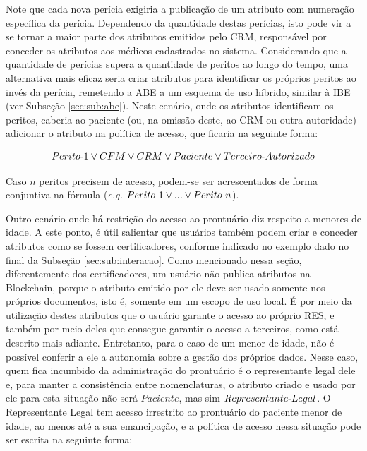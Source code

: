 \documentclass[a4paper,11pt]{article}
\begin{document}
Note que cada nova perícia exigiria a publicação de um atributo com numeração específica da perícia. Dependendo da quantidade destas perícias, isto pode vir a se tornar a maior parte dos atributos emitidos pelo CRM, responsável por conceder os atributos aos médicos cadastrados no sistema. Considerando que a quantidade de perícias supera a quantidade de peritos ao longo do tempo, uma alternativa mais eficaz seria criar atributos para identificar os próprios peritos ao invés da perícia, remetendo a ABE a um esquema de uso híbrido, similar à IBE (ver Subseção \ref{sec:sub:abe}).
Neste cenário, onde os atributos identificam os peritos, caberia ao paciente (ou, na omissão deste, ao CRM ou outra autoridade) adicionar o atributo na política de acesso, que ficaria na seguinte forma:

\[ Perito\textnormal{-}1 \vee CFM \vee CRM \vee Paciente \vee Terceiro\textnormal{-}Autorizado \]

Caso $n$ peritos precisem de acesso, podem-se ser acrescentados de forma conjuntiva na fórmula (\emph{e.g.} $Perito\textnormal{-}1 \vee ... \vee Perito\textnormal{-}n$).

Outro cenário onde há restrição do acesso ao prontuário diz respeito a menores de idade.
A este ponto, é útil salientar que usuários também podem criar e conceder atributos como se fossem certificadores, conforme indicado no exemplo dado no final da Subseção \ref{sec:sub:interacao}.
Como mencionado nessa seção, diferentemente dos certificadores, um usuário não publica atributos na Blockchain, porque o atributo emitido por ele deve ser usado somente nos próprios documentos, isto é, somente em um escopo de uso local.
É por meio da utilização destes atributos que o usuário garante o acesso ao próprio RES, e também por meio deles que consegue garantir o acesso a terceiros, como está descrito mais adiante.
Entretanto, para o caso de um menor de idade, não é possível conferir a ele a autonomia sobre a gestão dos próprios dados.
Nesse caso, quem fica incumbido da administração do prontuário é o representante legal dele e, para manter a consistência entre nomenclaturas, o atributo criado e usado por ele para esta situação não será $Paciente$, mas sim $Representante\textnormal{-}Legal$. %
O Representante Legal tem acesso irrestrito ao prontuário do paciente menor de idade, ao menos até a sua emancipação, e a política de acesso nessa situação pode ser escrita na seguinte forma:
\end{document}

